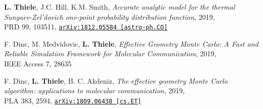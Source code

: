 \begin{minipage}{\textwidth}
{\bf L. Thiele}, J.C. Hill, K.M. Smith,
\emph{Accurate analytic model for the thermal Sunyaev-Zel'dovich one-point probability distribution function}, 2019,\\
PRD 99, 103511,
\href{https://arxiv.org/abs/1812.05584}{\mbox{\texttt{arXiv:1812.05584 [astro-ph.CO]}}}
\end{minipage}

\begin{minipage}{\textwidth}
F. Dinc, M. Medvidovic, {\bf L. Thiele},
\emph{Effective Geometry Monte Carlo: A Fast and Reliable Simulation Framework for Molecular Communication}, 2019,\\
IEEE Access 7, 28635
\end{minipage}

\begin{minipage}{\textwidth}
F. Dinc, {\bf L. Thiele}, B. C. Akdeniz,
\emph{The effective geometry Monte Carlo algorithm: applications to molecular communication}, 2019,\\
PLA 383, 2594,
\href{https://arxiv.org/abs/1809.06438}{\mbox{\texttt{arXiv:1809.06438 [cs.ET]}}}
\end{minipage}
